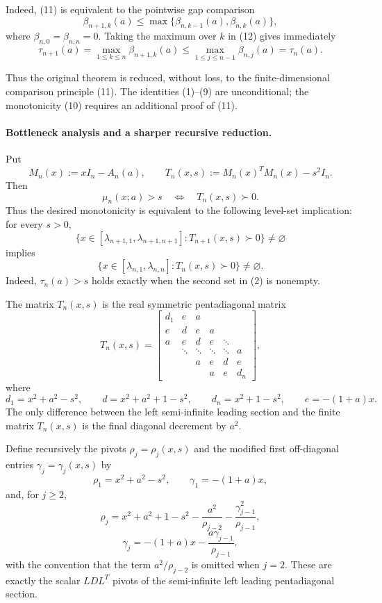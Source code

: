 \documentclass[11pt]{article}
\begin{document}
Indeed, (11) is equivalent to the pointwise gap comparison
\[
\beta_{n+1,k}(a)
\le
\max\{\beta_{n,k-1}(a),\beta_{n,k}(a)\},
\tag{12}
\]
where \(\beta_{n,0}=\beta_{n,n}=0\). Taking the maximum over \(k\) in
(12) gives immediately
\[
\tau_{n+1}(a)
=
\max_{1\le k\le n}\beta_{n+1,k}(a)
\le
\max_{1\le j\le n-1}\beta_{n,j}(a)
=
\tau_n(a).
\]

Thus the original theorem is reduced, without loss, to the finite-dimensional
comparison principle (11). The identities (1)--(9) are unconditional; the
monotonicity (10) requires an additional proof of (11).

\paragraph{Bottleneck analysis and a sharper recursive reduction.}
Put
\[
M_n(x):=xI_n-A_n(a),
\qquad
T_n(x,s):=M_n(x)^TM_n(x)-s^2I_n .
\]
Then
\[
\mu_n(x;a)>s
\quad\Longleftrightarrow\quad
T_n(x,s)\succ0 .
\tag{1}
\]
Thus the desired monotonicity is equivalent to the following level-set implication:
for every \(s>0\),
\[
\{x\in[\lambda_{n+1,1},\lambda_{n+1,n+1}]:T_{n+1}(x,s)\succ0\}\ne\varnothing
\]
implies
\[
\{x\in[\lambda_{n,1},\lambda_{n,n}]:T_n(x,s)\succ0\}\ne\varnothing .
\tag{2}
\]
Indeed, \(\tau_n(a)>s\) holds exactly when the second set in (2) is nonempty.

The matrix \(T_n(x,s)\) is the real symmetric pentadiagonal matrix
\[
T_n(x,s)=
\begin{bmatrix}
d_1& e & a \\
e& d & e & a\\
a&e&d&e&\ddots\\
&\ddots&\ddots&\ddots&\ddots&a\\
&&a&e&d&e\\
&&&a&e&d_n
\end{bmatrix},
\tag{3}
\]
where
\[
d_1=x^2+a^2-s^2,\qquad
d=x^2+a^2+1-s^2,\qquad
d_n=x^2+1-s^2,\qquad
e=-(1+a)x .
\tag{4}
\]
The only difference between the left semi-infinite leading section and the finite matrix
\(T_n(x,s)\) is the final diagonal decrement by \(a^2\).

Define recursively the pivots \(\rho_j=\rho_j(x,s)\) and the modified first off-diagonal
entries \(\gamma_j=\gamma_j(x,s)\) by
\[
\rho_1=x^2+a^2-s^2,\qquad \gamma_1=-(1+a)x,
\tag{5}
\]
and, for \(j\ge2\),
\[
\rho_j
=
x^2+a^2+1-s^2
-\frac{a^2}{\rho_{j-2}}
-\frac{\gamma_{j-1}^2}{\rho_{j-1}},
\tag{6}
\]
\[
\gamma_j
=
-(1+a)x-\frac{a\gamma_{j-1}}{\rho_{j-1}},
\tag{7}
\]
with the convention that the term \(a^2/\rho_{j-2}\) is omitted when \(j=2\).
These are exactly the scalar \(LDL^T\) pivots of the semi-infinite left leading
pentadiagonal section.
\end{document}
